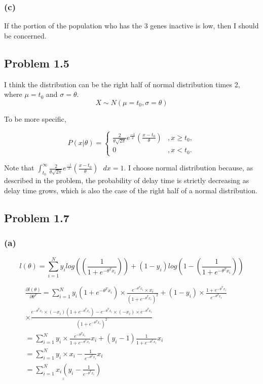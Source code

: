 \documentclass{article}
\begin{document}
\subsubsection*{(c)}
	If the portion of the population who has the 3 genes inactive is low, then I should be concerned.
	
\subsection*{Problem 1.5}
	I think the distribution can be the right half of normal distribution times 2, where $\mu = t_0$ and $\sigma = \theta$.
	\begin{equation*}
		X\sim N(\mu = t_0,\sigma = \theta)
	\end{equation*}
	
	To be more specific,

        \[ P(x|\theta)=\begin{cases} 
              \frac{2}{ \theta \sqrt{2\pi}}e^{\frac{-1}{2}}(\frac{x-t_0}{\theta}) &, x\geq t_0, \\
              0 &, x<t_0. 
           \end{cases}
        \]
	
	Note that $\int_{t_0}^{\infty} \frac{2}{ \theta \sqrt{2\pi}}e^{\frac{-1}{2}}(\frac{x-t_0}{\theta}) \text{  }dx = 1$.
	I choose normal distribution because, as described in the problem, the probability of delay time is strictly decreasing as delay time grows, which is also the case of the right half of a normal distribution.
	
	
\subsection*{Problem 1.7}
\subsubsection*{(a)}
	\begin{equation*}
		l(\theta) = \sum_{i=1}^{N} y_ilog((\frac{1}{1+e^{-\theta^T x_i}})) + (1-y_i)log(1-(\frac{1}{1+e^{-\theta^Tx_i}})) 
	\end{equation*}
	

		\begin{equation*}
		\begin{aligned}
    		\frac{\partial l(\theta)}{\partial \theta^T} = \sum_{i=1}^{N} y_i(1+e^{-\theta^Tx_i})\times \frac{e^{-\theta^Tx_i}\times x_i}{(1+e^{-\theta^Tx_i})^2}  + (1-y_i) \times \frac{1+e^{-\theta^Tx_i}}{e^{-\theta^Tx_i}} &&\\ 
		 \times \frac{e^{-\theta^Tx_i}\times (-x_i)(1+e^{-\theta^Tx_i})-e^{-\theta^Tx_i} \times (-x_i)\times e^{-\theta^Tx_i}}{(1+e^{-\theta^Tx_i})^2 } \\
		 = \sum_{i=1}^{N}y_i \times \frac{e^{-\theta^Tx_i}}{1+e^{-\theta^Tx_i}}x_i + (y_i-1)\frac{1}{1+e^{-\theta^Tx_i}}x_i \\
		 = \sum_{i=1}^{N}y_i\times x_i - \frac{1}{e^{-\theta^Tx_i }}x_i\\
		\underline{ \underline{=\sum_{i=1}^{N}x_i(y_i-\frac{1}{e^{-\theta^Tx_i}})}}
		\end{aligned}
		\end{equation*}
\end{document}
